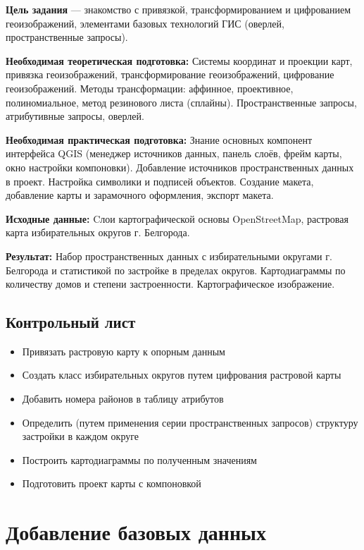 \documentclass[
  12pt,
]{book}
\providecommand{\tightlist}{%
  \setlength{\itemsep}{0pt}\setlength{\parskip}{0pt}}
\begin{document}
\textbf{Цель задания} --- знакомство с привязкой, трансформированием и цифрованием геоизображений, элементами базовых технологий ГИС (оверлей, пространственные запросы).

\textbf{Необходимая теоретическая подготовка:} Системы координат и проекции карт, привязка геоизображений, трансформирование геоизображений, цифрование геоизображений. Методы трансформации: аффинное, проективное, полиномиальное, метод резинового листа (сплайны). Пространственные запросы, атрибутивные запросы, оверлей.

\textbf{Необходимая практическая подготовка:} Знание основных компонент интерфейса QGIS (менеджер источников данных, панель слоёв, фрейм карты, окно настройки компоновки). Добавление источников пространственных данных в проект. Настройка символики и подписей объектов. Создание макета, добавление карты и зарамочного оформления, экспорт макета.

\textbf{Исходные данные:} Cлои картографической основы OpenStreetMap, растровая карта избирательных округов г. Белгорода.

\textbf{Результат:} Набор пространственных данных с избирательными округами г. Белгорода и статистикой по застройке в пределах округов. Картодиаграммы по количеству домов и степени застроенности. Картографическое изображение.

\hypertarget{map-ref-economic-control}{%
\subsection{Контрольный лист}\label{map-ref-economic-control}}

\begin{itemize}
\tightlist
\item
  Привязать растровую карту к опорным данным
\item
  Создать класс избирательных округов путем цифрования растровой карты
\item
  Добавить номера районов в таблицу атрибутов
\item
  Определить (путем применения серии пространственных запросов) структуру застройки в каждом округе
\item
  Построить картодиаграммы по полученным значениям
\item
  Подготовить проект карты с компоновкой
\end{itemize}

\hypertarget{map-ref-districts-basemap}{%
\section{Добавление базовых данных}\label{map-ref-districts-basemap}}
\end{document}
